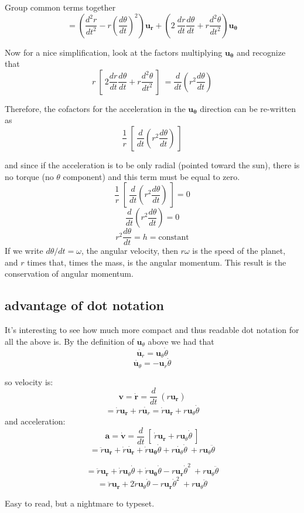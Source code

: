 \documentclass[11pt, oneside]{article}
\begin{document}
Group common terms together
\[ = (\frac{d^2r}{dt^2} - r (\frac{d\theta}{dt})^2 ) \mathbf{u_r}  + (2 \ \frac{dr}{dt} \frac{d\theta}{dt} + r \frac{d^2\theta}{dt^2}) \mathbf{u_{\theta}}  \]

Now for a nice simplification, look at the factors multiplying $\mathbf{u_{\theta}}$ and recognize that
\[ r \ [ \ 2 \frac{dr}{dt} \frac{d\theta}{dt} + r \frac{d^2\theta}{dt^2} \ ] \  = \frac{d}{dt} ( r^2 \frac{d\theta}{dt}) \]

Therefore, the cofactors for the acceleration in the $\mathbf{u_{\theta}}$ direction can be re-written as
\[ \frac{1}{r} \ [ \ \frac{d}{dt} ( r^2 \frac{d\theta}{dt}) \ ] \]

and since if the acceleration is to be only radial (pointed toward the sun), there is no torque (no $\theta$ component) and this term must be equal to zero.
\[ \frac{1}{r} \ [ \ \frac{d}{dt} ( r^2 \frac{d\theta}{dt}) \ ]  = 0 \]
\[ \frac{d}{dt} ( r^2 \frac{d\theta}{dt}) = 0 \]
\[ r^2 \frac{d\theta}{dt} = h = \text{constant} \]
If we write $d\theta/dt = \omega$, the angular velocity, then $r \omega$ is the speed of the planet, and $r$ times that, times the mass, is the angular momentum.  This result is the conservation of angular momentum.

\subsection*{advantage of dot notation}
It's interesting to see how much more compact and thus readable dot notation for all the above is.
By the definition of $\mathbf{u}_{\theta}$ above we had that
\[ \dot{\mathbf{u}_{r}} =  \mathbf{u}_{\theta} \dot{\theta} \]
\[ \dot{\mathbf{u}_{\theta}} =  - \mathbf{u}_{r} \dot{\theta} \]

so velocity is:
\[ \mathbf{v} = \dot{\mathbf{r}} = \frac{d}{dt} \ (r \mathbf{u_r}) \]
\[ = \dot{r} \mathbf{u_r} + r \dot{\mathbf{u}_r} = \dot{r} \mathbf{u_r} + r \mathbf{u}_{\theta} \dot{\theta} \]
and acceleration:
\[ \mathbf{a} = \dot{\mathbf{v}} = \frac{d}{dt} \ [ \  \dot{r} \mathbf{u_r} + r \mathbf{u}_{\theta} \dot{\theta} \ ] \]
\[ = \ddot{r} \mathbf{u_r} + \dot{r} \dot{\mathbf{u_r}} + \dot{r} \mathbf{u_{\theta}} \dot{\theta} + r \dot{\mathbf{u}_{\theta}} \dot{\theta} \ + r \mathbf{u}_{\theta} \ddot{\theta} \]

\[ = \ddot{r} \mathbf{u_r} + \dot{r} \mathbf{u}_{\theta} \dot{\theta} + \dot{r} \mathbf{u_{\theta}} \dot{\theta} - r \mathbf{u_{r}} \dot{\theta}^2 \ + r \mathbf{u}_{\theta} \ddot{\theta} \]
\[ = \ddot{r} \mathbf{u_r} + 2\dot{r} \mathbf{u}_{\theta} \dot{\theta}  - r \mathbf{u_{r}} \dot{\theta}^2 \ + r \mathbf{u}_{\theta} \ddot{\theta} \]

Easy to read, but a nightmare to typeset.
\end{document}
